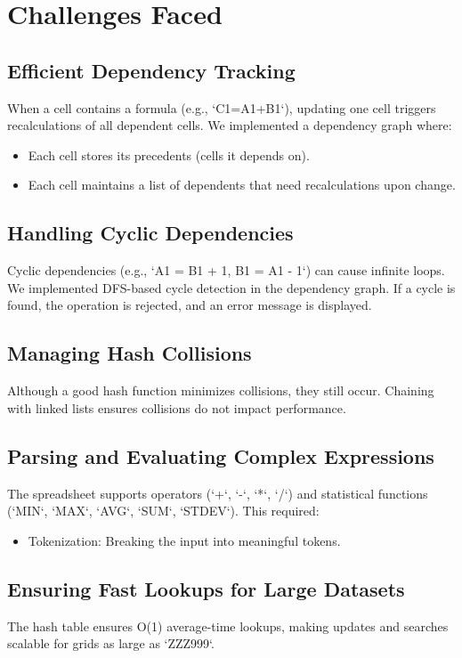 \documentclass[a4paper,12pt]{article}
\begin{document}
\section{Challenges Faced}
\subsection{Efficient Dependency Tracking}
When a cell contains a formula (e.g., `C1=A1+B1`), updating one cell triggers recalculations of all dependent cells. We implemented a dependency graph where:
\begin{itemize}
    \item Each cell stores its precedents (cells it depends on).
    \item Each cell maintains a list of dependents that need recalculations upon change.
\end{itemize}

\subsection{Handling Cyclic Dependencies}
Cyclic dependencies (e.g., `A1 = B1 + 1, B1 = A1 - 1`) can cause infinite loops. We implemented DFS-based cycle detection in the dependency graph. If a cycle is found, the operation is rejected, and an error message is displayed.

\subsection{Managing Hash Collisions}
Although a good hash function minimizes collisions, they still occur. Chaining with linked lists ensures collisions do not impact performance.

\subsection{Parsing and Evaluating Complex Expressions}
The spreadsheet supports operators (`+`, `-`, `*`, `/`) and statistical functions (`MIN`, `MAX`, `AVG`, `SUM`, `STDEV`). This required:
\begin{itemize}
    \item Tokenization: Breaking the input into meaningful tokens.
\end{itemize}

\subsection{Ensuring Fast Lookups for Large Datasets}
The hash table ensures O(1) average-time lookups, making updates and searches scalable for grids as large as `ZZZ999`.
\end{document}
